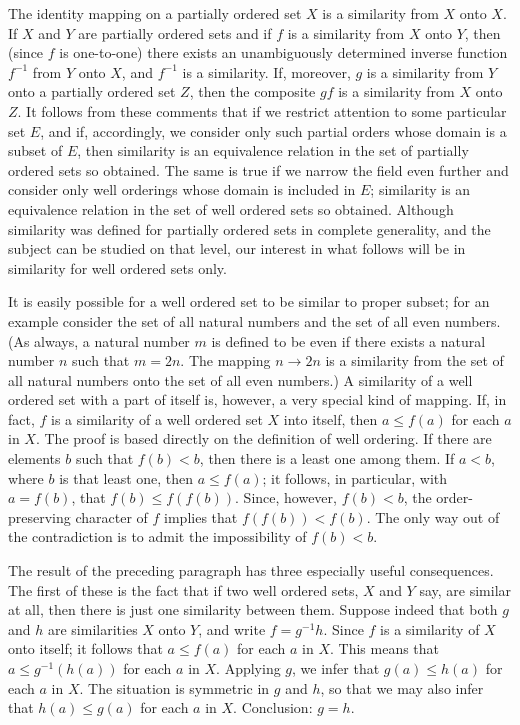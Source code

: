 The identity mapping on a partially ordered set $X$ is a similarity from $X$ onto $X$. If $X$ and $Y$ are partially ordered sets and if $f$ is a similarity from $X$ onto $Y$, then (since $f$ is one-to-one) there exists an unambiguously determined inverse function $f^{-1}$ from $Y$ onto $X$, and $f^{-1}$ is a similarity. If, moreover, $g$ is a similarity from $Y$ onto a partially ordered set $Z$, then the composite $gf$ is a similarity from $X$ onto $Z$. It follows from these comments that if we restrict attention to some particular set $E$, and if, accordingly, we consider only such partial orders whose domain is a subset of $E$, then similarity is an equivalence relation in the set of partially ordered sets so obtained. The same is true if we narrow the field even further and consider only well orderings whose domain is included in $E$; similarity is an equivalence relation in the set of well ordered sets so obtained. Although similarity was defined for partially ordered sets in complete generality, and the subject can be studied on that level, our interest in what follows will be in similarity for well ordered sets only. 

It is easily possible for a well ordered set to be similar to proper subset; for an example consider the set of all natural numbers and the set of all even numbers. (As always, a natural number $m$ is defined to be even if there exists a natural number $n$ such that $m = 2n$. The mapping $n \rightarrow 2n$ is a similarity from the set of all natural numbers onto the set of all even numbers.) A similarity of a well ordered set with a part of itself is, however, a very special kind of mapping. If, in fact, $f$ is a similarity of a well ordered set $X$ into itself, then $a \le f(a)$ for each $a$ in $X$. The proof is based directly on the definition of well ordering. If there are elements $b$ such that $f(b) < b$, then there is a least one among them. If $a < b$, where $b$ is that least one, then $a \le f(a)$; it follows, in particular, with $a = f(b)$, that $f(b) \le f(f(b))$. Since, however, $f(b) < b$, the order-preserving character of $f$ implies that $f(f(b)) < f(b)$. The only way out of the contradiction is to admit the impossibility of $f(b) < b$. 

The result of the preceding paragraph has three especially useful consequences. The first of these is the fact that if two well ordered sets, $X$ and $Y$ say, are similar at all, then there is just one similarity between them. Suppose indeed that both $g$ and $h$ are similarities $X$ onto $Y$, and write $f = g^{-1}h$. Since $f$ is a similarity of $X$ onto itself; it follows that $a \le f(a)$ for each $a$ in $X$. This means that $a \le g^{-1}(h(a))$ for each $a$ in $X$. Applying $g$, we infer that $g(a) \le h(a)$ for each $a$ in $X$. The situation is symmetric in $g$ and $h$, so that we may also infer that $h(a) \le g(a)$ for each $a$ in $X$. Conclusion: $g = h$. 

